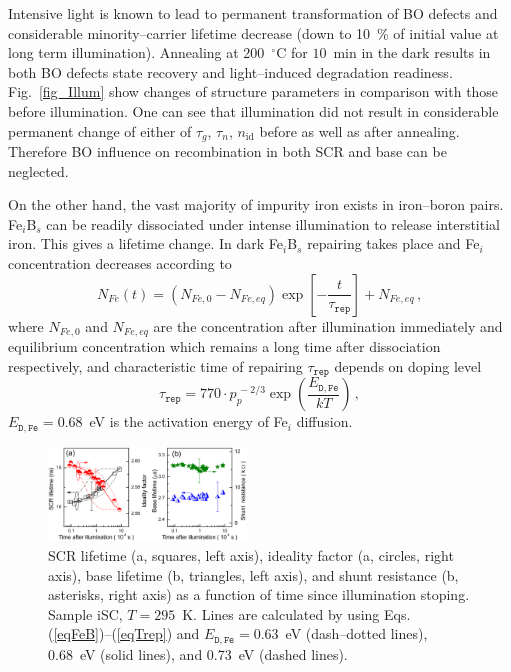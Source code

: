 \documentclass[aip,jap, amsmath,amssymb,reprint]{revtex4-1}
\begin{document}
Intensive light is known\cite{LIDRev,LIDRev2} to lead to permanent transformation of BO defects and considerable minority--carrier lifetime decrease (down to 10~\% of initial value at long term illumination).
Annealing at 200~$^\circ$C for $10$~min in the dark results in both BO defects state recovery and light--induced degradation readiness.
Fig.~\ref{fig_Illum} show changes of structure parameters in comparison with those before illumination.
One can see that illumination did not result in considerable permanent change of either of $\tau_g$, $\tau_n$, $n_{\mathrm{id}}$ before as well as after annealing.
Therefore BO influence on recombination in both SCR and base can be neglected.

On the other hand, the vast majority of impurity iron exists in iron--boron pairs.
Fe$_i$B$_s$ can be readily dissociated under intense illumination to release interstitial iron.
This gives a lifetime change.
In dark Fe$_i$B$_s$ repairing takes place and Fe$_i$ concentration decreases according to \cite{MurphyJAP2011,Wijaranakula}
\begin{equation}
\label{eqFeB}
N_{Fe}(t)=(N_{Fe,0}-N_{Fe,eq})\exp\left[-\frac{t}{\tau_{\mathtt{rep}}}\right]+N_{Fe,eq}\,,
\end{equation}
where
$N_{Fe,0}$ and $N_{Fe,eq}$ are the concentration after illumination immediately and equilibrium
concentration which remains a long time after dissociation respectively,
and characteristic time of repairing $\tau_{\mathtt{rep}}$ depends on doping level
\begin{equation}
\label{eqTrep}
\tau_{\mathtt{rep}}=770\cdot p_p^{\,-2/3}\exp\left(\frac{E_{\mathtt{D,Fe}}}{kT}\right)\,,
\end{equation}
$E_{\mathtt{D,Fe}}=0.68$~eV is the activation energy of Fe$_i$ diffusion.

\begin{figure}
\includegraphics[width=0.47\textwidth]{olikhFigTime}%
\caption{\label{fig_Time}
SCR lifetime (a, squares, left axis), ideality factor (a, circles, right axis), base  lifetime (b, triangles, left axis), and shunt resistance (b, asterisks, right axis) as a function of time since illumination stoping.
Sample iSC, $T=295$~K.
Lines are calculated by using Eqs.(\ref{eqFeB})--(\ref{eqTrep}) and $E_{\mathtt{D,Fe}}=0.63$~eV (dash--dotted lines), 0.68~eV (solid lines), and 0.73~eV (dashed lines).
}%
\end{figure}
\end{document}
